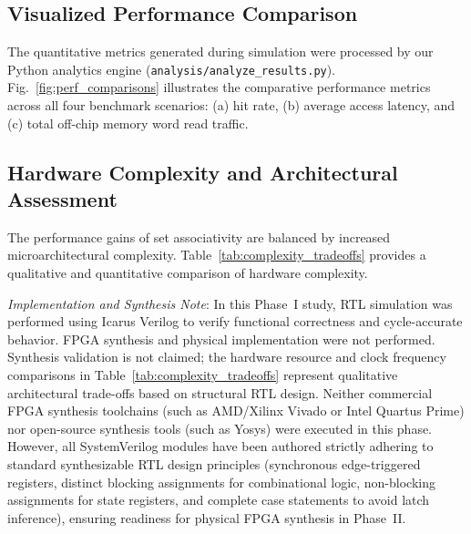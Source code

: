\documentclass[conference]{IEEEtran}
\begin{document}
\subsection{Visualized Performance Comparison}
The quantitative metrics generated during simulation were processed by our Python analytics engine (\texttt{analysis/analyze\_results.py}). Fig.~\ref{fig:perf_comparisons} illustrates the comparative performance metrics across all four benchmark scenarios: (a) hit rate, (b) average access latency, and (c) total off-chip memory word read traffic.

\subsection{Hardware Complexity and Architectural Assessment}
The performance gains of set associativity are balanced by increased microarchitectural complexity. Table~\ref{tab:complexity_tradeoffs} provides a qualitative and quantitative comparison of hardware complexity.

\begin{table}[htbp]
\caption{Hardware Complexity and Resource Comparison}
\label{tab:complexity_tradeoffs}
\centering
{}
\end{table}

\textit{Implementation and Synthesis Note}: In this Phase~I study, RTL simulation was performed using Icarus Verilog to verify functional correctness and cycle-accurate behavior. FPGA synthesis and physical implementation were not performed. Synthesis validation is not claimed; the hardware resource and clock frequency comparisons in Table~\ref{tab:complexity_tradeoffs} represent qualitative architectural trade-offs based on structural RTL design. Neither commercial FPGA synthesis toolchains (such as AMD/Xilinx Vivado or Intel Quartus Prime) nor open-source synthesis tools (such as Yosys) were executed in this phase. However, all SystemVerilog modules have been authored strictly adhering to standard synthesizable RTL design principles (synchronous edge-triggered registers, distinct blocking assignments for combinational logic, non-blocking assignments for state registers, and complete case statements to avoid latch inference), ensuring readiness for physical FPGA synthesis in Phase~II.
\end{document}
